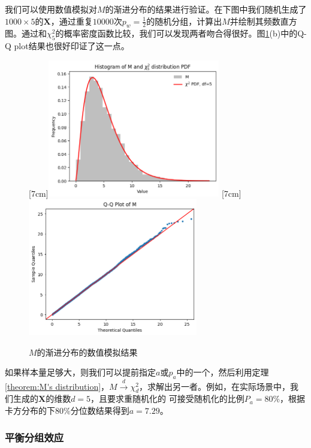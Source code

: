 我们可以使用数值模拟对$M$的渐进分布的结果进行验证。在下图中我们随机生成了$1000\times5$的$\mathbf{X}$，通过重复$10000$次$p_w = \frac{1}{2}$的随机分组，计算出$M$并绘制其频数直方图。通过和$\chi_5^2$的概率密度函数比较，我们可以发现两者吻合得很好。图\ref{fig:bisubcaptionbox}(b)中的Q-Q plot结果也很好印证了这一点。

\begin{figure}[!hbtp]
  \centering
                [7cm]{\includegraphics[height=6cm]{figures/chi-square.png}}
  \hspace{1cm}
                [7cm]{\includegraphics[height=6cm]{figures/qqplot.png}}
  \caption{$M$的渐进分布的数值模拟结果}
  \label{fig:bisubcaptionbox}
\end{figure}

如果样本量足够大，则我们可以提前指定$a$或$p_a$中的一个，然后利用定理\ref{theorem:M's distribution}，$M \overset{d}\longrightarrow \chi^2_d$，求解出另一者。例如，在实际场景中，我们生成的$\mathbf{X}$的维数$d=5$，且要求重随机化的
可接受随机化的比例$P_a=80\%$，根据卡方分布的下80\%分位数结果得到$a=7.29$。

\subsubsection{平衡分组效应}

